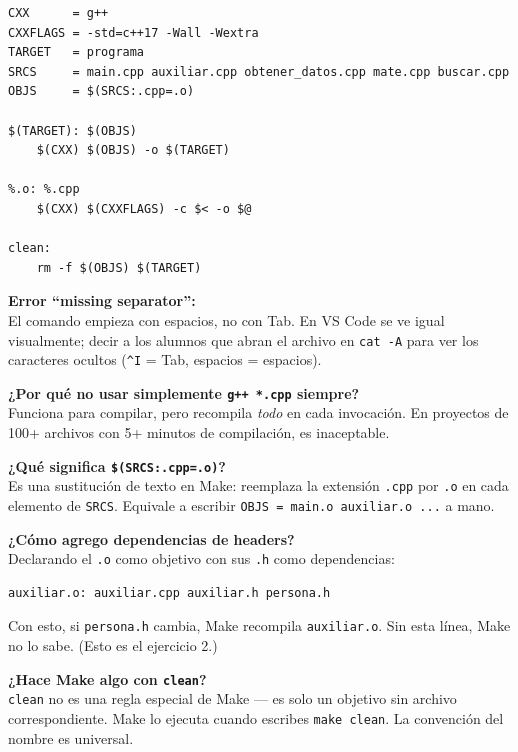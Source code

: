 \documentclass[12pt, oneside]{article}
\begin{document}
\begin{verbatim}
CXX      = g++
CXXFLAGS = -std=c++17 -Wall -Wextra
TARGET   = programa
SRCS     = main.cpp auxiliar.cpp obtener_datos.cpp mate.cpp buscar.cpp
OBJS     = $(SRCS:.cpp=.o)

$(TARGET): $(OBJS)
	$(CXX) $(OBJS) -o $(TARGET)

%.o: %.cpp
	$(CXX) $(CXXFLAGS) -c $< -o $@

clean:
	rm -f $(OBJS) $(TARGET)
\end{verbatim}

\begin{notaprofesor}
  \textbf{Error ``missing separator'':}\\
  El comando empieza con espacios, no con Tab.  En VS Code se ve igual
  visualmente; decir a los alumnos que abran el archivo en \texttt{cat -A}
  para ver los caracteres ocultos (\texttt{\^{}I} = Tab, espacios = espacios).

  \medskip
  \textbf{¿Por qué no usar simplemente \texttt{g++ *.cpp} siempre?}\\
  Funciona para compilar, pero recompila \textit{todo} en cada invocación.
  En proyectos de 100+ archivos con 5+ minutos de compilación, es inaceptable.

  \medskip
  \textbf{¿Qué significa \texttt{\$(SRCS:.cpp=.o)}?}\\
  Es una sustitución de texto en Make: reemplaza la extensión \texttt{.cpp}
  por \texttt{.o} en cada elemento de \texttt{SRCS}.  Equivale a escribir
  \texttt{OBJS = main.o auxiliar.o ...} a mano.

  \medskip
  \textbf{¿Cómo agrego dependencias de headers?}\\
  Declarando el \texttt{.o} como objetivo con sus \texttt{.h} como
  dependencias:
\begin{verbatim}
auxiliar.o: auxiliar.cpp auxiliar.h persona.h
\end{verbatim}
  Con esto, si \texttt{persona.h} cambia, Make recompila \texttt{auxiliar.o}.
  Sin esta línea, Make no lo sabe.  (Esto es el ejercicio 2.)

  \medskip
  \textbf{¿Hace Make algo con \texttt{clean}?}\\
  \texttt{clean} no es una regla especial de Make — es solo un objetivo
  sin archivo correspondiente.  Make lo ejecuta cuando escribes
  \texttt{make clean}.  La convención del nombre es universal.
\end{notaprofesor}

\end{document}
